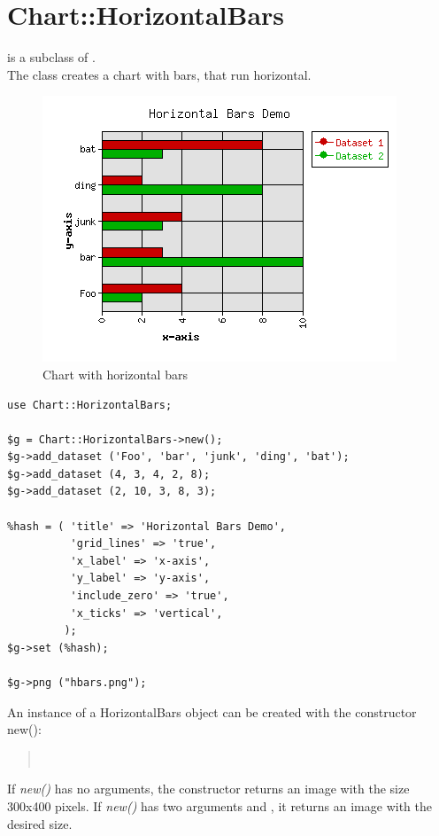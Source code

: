 %
%
\section{Chart::HorizontalBars}
\begin{Description} 
 is a subclass of .\\
The class  creates a chart with bars, that run horizontal.
\end{Description}


\begin{figure}[h]
	\begin{center}
		\includegraphics[scale=0.7]{d_hbars4.png}
	\end{center}
	\caption{Chart with horizontal bars}
	\label{fig:hbars}
\end{figure}
\begin{verbatim}
use Chart::HorizontalBars;

$g = Chart::HorizontalBars->new();
$g->add_dataset ('Foo', 'bar', 'junk', 'ding', 'bat');
$g->add_dataset (4, 3, 4, 2, 8);
$g->add_dataset (2, 10, 3, 8, 3);

%hash = ( 'title' => 'Horizontal Bars Demo',
          'grid_lines' => 'true',
          'x_label' => 'x-axis',
          'y_label' => 'y-axis',
          'include_zero' => 'true',
          'x_ticks' => 'vertical',
         );
$g->set (%hash);

$g->png ("hbars.png");
\end{verbatim}

\begin{Constructor} 
An instance of a HorizontalBars object can be created with the constructor new():
\begin{quote}
\parindent 0pt
\\
\end{quote}

If \textit{new()} has no arguments, the constructor returns an image with the size 300x400 pixels.
If \textit{new()} has two arguments  and , 
it returns an image with the desired size.
\end{Constructor}

